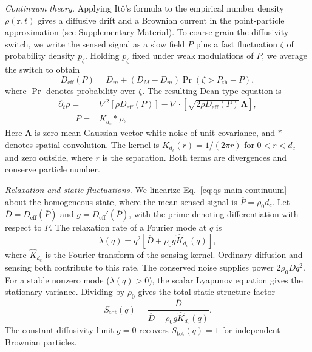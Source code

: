 \documentclass[aps,prl,reprint,letterpaper,nobalancelastpage]{revtex4-2}
\begin{document}
\emph{Continuum theory.} Applying It\^{o}'s formula to the empirical number density \(\rho(\mathbf r,t)\) gives a diffusive drift and a Brownian current in the point-particle approximation (see Supplementary Material). To coarse-grain the diffusivity switch, we write the sensed signal as a slow field \(P\) plus a fast fluctuation \(\zeta\) of probability density \(p_\zeta\). Holding \(p_\zeta\) fixed under weak modulations of \(P\), we average the switch to obtain
\begin{equation}
 D_{\mathrm{eff}}(P)
 =D_m+(D_M-D_m)\Pr(\zeta>P_{\mathrm{th}}-P),
 \label{eq:qs-main-effective}
\end{equation}
where \(\Pr\) denotes probability over \(\zeta\). The resulting Dean-type equation is
\begin{equation}
    \begin{aligned}
        \partial_t\rho={}&\nabla^2[\rho D_{\mathrm{eff}}(P)]-\nabla\cdot\!\left[\sqrt{2\rho D_{\mathrm{eff}}(P)}\,\boldsymbol\Lambda\right],\\
        \qquad P={}&K_{d_c}*\rho ,
    \end{aligned}
    \label{eq:qs-main-continuum}
\end{equation}
Here \(\boldsymbol\Lambda\) is zero-mean Gaussian vector white noise of unit covariance, and \(*\) denotes spatial convolution. The kernel is \(K_{d_c}(r)=1/(2\pi r)\) for \(0<r<d_c\) and zero outside, where \(r\) is the separation. Both terms are divergences and conserve particle number.

\emph{Relaxation and static fluctuations.} We linearize Eq.~\eqref{eq:qs-main-continuum} about the homogeneous state, where the mean sensed signal is \(\overline P=\rho_0d_c\). Let \(\overline D=D_{\mathrm{eff}}(\overline P)\) and \(g=D_{\mathrm{eff}}'(\overline P)\), with the prime denoting differentiation with respect to \(P\). The relaxation rate of a Fourier mode at \(q\) is
\begin{equation}
 \lambda(q)=q^2[\overline D+\rho_0g\widehat K_{d_c}(q)],
 \label{eq:qs-main-relaxation}
\end{equation}
where \(\widehat K_{d_c}\) is the Fourier transform of the sensing kernel. Ordinary diffusion and sensing both contribute to this rate. The conserved noise supplies power \(2\rho_0\overline Dq^2\). For a stable nonzero mode (\(\lambda(q)>0\)), the scalar Lyapunov equation gives the stationary variance. Dividing by \(\rho_0\) gives the total static structure factor
\begin{equation}
 S_{\mathrm{tot}}(q)=
 \frac{\overline D}{\overline D+\rho_0g\widehat K_{d_c}(q)} .
 \label{eq:qs-main-spectrum}
\end{equation}
The constant-diffusivity limit \(g=0\) recovers \(S_{\mathrm{tot}}(q)=1\) for independent Brownian particles.
\end{document}
